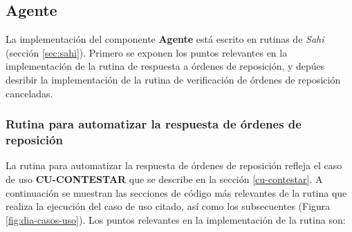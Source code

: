 \subsection{Agente}\label{sec:agente}
La implementación del componente \textbf{Agente} está escrito en rutinas de \textit{Sahi} (sección \ref{sec:sahi}). Primero se exponen los puntos relevantes en la implementación de la rutina de respuesta a órdenes de reposición, y depúes desribir la implementación de la rutina de verificación de órdenes de reposición canceladas.

\subsubsection{Rutina para automatizar la respuesta de órdenes de reposición}\label{sec:aut-contestar}
La rutina para automatizar la respuesta de órdenes de reposición refleja el caso de uso \textbf{CU-CONTESTAR} que se describe en la sección \ref{cu-contestar}. A continuación se muestran las secciones de código más relevantes de la rutina que realiza la ejecución del caso de uso citado, así como los subsecuentes (Figura \ref{fig:dia-casos-uso}). Los puntos relevantes en la implementación de la rutina son:
